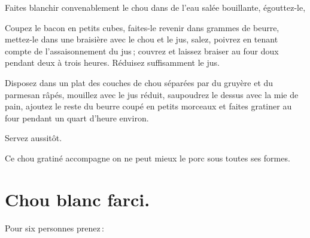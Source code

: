 Faites blanchir convenablement le chou dans de l'eau salée bouillante, égouttez-le,

Coupez le bacon en petits cubes, faites-le revenir dans {\mmm} grammes de
beurre, mettez-le dans une braisière avec le chou et le jus, salez, poivrez en
tenant compte de l’assaisonnement du jus ; couvrez et laissez braiser au four
doux pendant deux à trois heures. Réduisez suffisamment le jus.

Disposez dans un plat des couches de chou séparées par du gruyère et du
parmesan râpés, mouillez avec le jus réduit, saupoudrez le dessus avec la mie
de pain, ajoutez le reste du beurre coupé en petits morceaux et faites gratiner
au four pendant un quart d'heure environ.

Servez aussitôt.

\medskip

Ce chou gratiné accompagne on ne peut mieux le porc sous toutes ses formes.

\section*{\centering Chou blanc farci.}
{}

Pour six personnes prenez :


